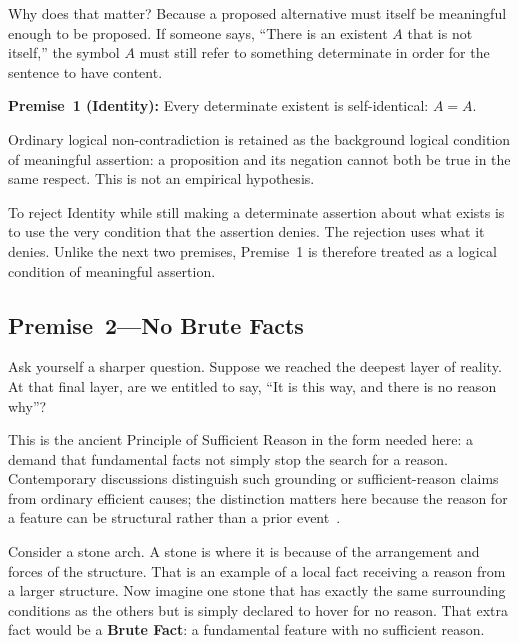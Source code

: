 \documentclass[11pt]{article}
\theoremstyle{canonstyle}
\begin{document}
Why does that matter? Because a proposed alternative must itself be meaningful enough to be proposed. If someone says, ``There is an existent $A$ that is not itself,'' the symbol $A$ must still refer to something determinate in order for the sentence to have content.

\begin{keyresult}
\textbf{Premise~1 (Identity):} Every determinate existent is self-identical: $A=A$.

Ordinary logical non-contradiction is retained as the background logical condition of meaningful assertion: a proposition and its negation cannot both be true in the same respect. This is not an empirical hypothesis.
\end{keyresult}

\begin{ifyoudisagree}
To reject Identity while still making a determinate assertion about what exists is to use the very condition that the assertion denies. The rejection uses what it denies. Unlike the next two premises, Premise~1 is therefore treated as a logical condition of meaningful assertion.
\end{ifyoudisagree}

\subsection{Premise~2---No Brute Facts}

\begin{reflect}
Ask yourself a sharper question. Suppose we reached the deepest layer of reality. At that final layer, are we entitled to say, ``It is this way, and there is no reason why''?
\end{reflect}

This is the ancient Principle of Sufficient Reason in the form needed here: a demand that fundamental facts not simply stop the search for a reason. Contemporary discussions distinguish such grounding or sufficient-reason claims from ordinary efficient causes; the distinction matters here because the reason for a feature can be structural rather than a prior event~\cite{SEPPSR,SEPGrounding}.

Consider a stone arch. A stone is where it is because of the arrangement and forces of the structure. That is an example of a local fact receiving a reason from a larger structure. Now imagine one stone that has exactly the same surrounding conditions as the others but is simply declared to hover for no reason. That extra fact would be a \textbf{Brute Fact}: a fundamental feature with no sufficient reason.
\end{document}
